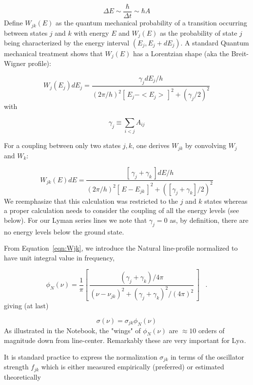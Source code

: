 \documentclass[graybox]{svmult}
\def\lya{Ly$\alpha$}
\def\ltk{\left [ \,}
\def\rtk{\, \right  ] }
\def\perd{\;\;\; .}
\def\smm{\sum\limits}
\begin{document}
\begin{equation}
\Delta E \sim \frac{\hbar}{\Delta t} \sim \hbar A
\end{equation}
Define $W_{jk}(E)$ as the quantum mechanical
probability of a transition occurring 
between states $j$ and $k$ with energy $E$
and $W_j(E)$ 
as the probability of state $j$ being characterized
by the energy interval $(E_j, E_j+dE_j)$.
A standard Quantum mechanical treatment shows that
$W_j(E)$ has a Lorentzian shape (aka the Breit-Wigner
profile): 

\begin{equation}
W_j(E_j) dE_j = \frac{\gamma_j dE_j/h}{(2\pi/h)^2 \ltk E_j - 
<E_j>\rtk^2 + (\gamma_j/2)^2}
\end{equation}
with  

\begin{equation}
\gamma_j \equiv \smm_{i<j} A_{ij}
\end{equation}


For a coupling between only two states $j,k$, one
derives $W_{jk}$ by convolving $W_j$ and $W_k$: 

\begin{equation}
W_{jk}(E) dE = \frac{\ltk \gamma_j + \gamma_k \rtk dE/h}{
(2\pi/h)^2 \ltk E - E_{jk}\rtk^2 + ([\gamma_j + \gamma_k]/2)^2}
\label{eqn:Wjk}
\end{equation}
We reemphasize that this calculation was restricted 
to the $j$ and $k$ states whereas a proper 
calculation needs to consider the coupling of all the 
energy levels (see below).  For our Lyman series lines we
note that $\gamma_j=0$ as, by definition, there are 
no energy levels below the ground state.

From Equation~\ref{eqn:Wjk}, we introduce
the Natural line-profile normalized to have 
unit integral value in frequency,

\begin{equation}
\phi_N(\nu) = \frac{1}{\pi} 
\ltk \frac{(\gamma_j + \gamma_k)/4\pi}{(\nu - \nu_{jk})^2
+ (\gamma_j + \gamma_k)^2 / (4\pi)^2} \rtk \perd
\end{equation}
giving (at last)

\begin{equation}
\sigma(\nu) = \sigma_{jk} \phi_N(\nu)
\end{equation}
As illustrated in the Notebook, 
the "wings" of $\phi_N(\nu)$ are 
$\approx 10$ orders of magnitude down 
from line-center.  Remarkably
these are very important for \lya.

It is standard practice to express the normalization
$\sigma_{jk}$ in terms of the oscillator strength $f_{jk}$
which is either measured empirically (preferred)
or estimated theoretically
\end{document}
